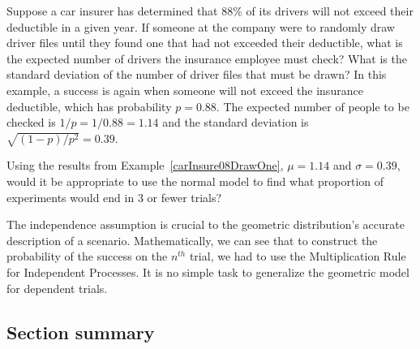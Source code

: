 \begin{examplewrap}
\begin{nexample}{Suppose a car insurer has determined
    that 88\% of its drivers will not exceed their deductible
    in a given year.
    If someone at the company were to randomly draw
    driver files until they found one that had not exceeded
    their deductible, what is the expected number of drivers
    the insurance employee must check?
    What is the standard deviation of the number of driver files
    that must be drawn?}
  \label{carInsure08DrawOne}%
  In this example, a success is again when someone will not
  exceed the insurance deductible, which has probability
  $p = 0.88$.
  The expected number of people to be checked is
  $1 / p = 1 / 0.88 = 1.14$ and the standard deviation is
  $\sqrt{(1-p)/p^2} = 0.39$.
\end{nexample}
\end{examplewrap}

\begin{exercisewrap}
\begin{nexercise}
Using the results from Example~\ref{carInsure08DrawOne},
$\mu = 1.14$ and $\sigma = 0.39$, would it be appropriate
to use the normal model to find what proportion
of experiments would end in 3 or fewer trials?\footnotemark{}
\end{nexercise}
\end{exercisewrap}

The independence assumption is crucial to the geometric
distribution's accurate description of a scenario.
Mathematically, we can see that to construct the probability
of the success on the $n^{th}$ trial, we had to use the
Multiplication Rule for Independent Processes.
It is no simple task to generalize the geometric model
for dependent trials.



\subsection*{Section summary}

